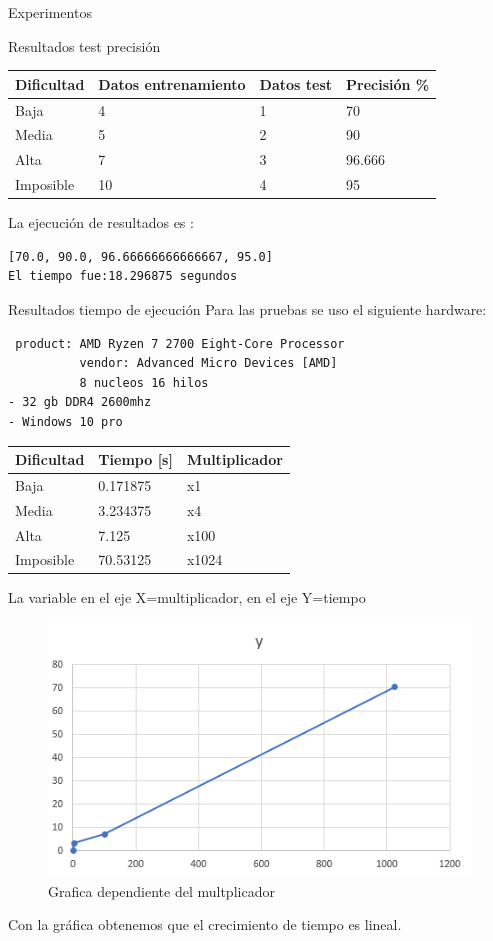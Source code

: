 \documentclass[
  spanish,
  ignorenonframetext,
]{beamer}
\begin{document}
\begin{frame}[fragile]{Experimentos}
\begin{block}{Resultados test precisión}
\begin{longtable}[]{@{}llll@{}}
\toprule
Dificultad & Datos entrenamiento & Datos test & Precisión
\%\tabularnewline
\midrule
\endhead
Baja & 4 & 1 & 70\tabularnewline
Media & 5 & 2 & 90\tabularnewline
Alta & 7 & 3 & 96.666\tabularnewline
Imposible & 10 & 4 & 95\tabularnewline
\bottomrule
\end{longtable}

La ejecución de resultados es :

\begin{verbatim}
[70.0, 90.0, 96.66666666666667, 95.0]
El tiempo fue:18.296875 segundos
\end{verbatim}
\end{block}

\begin{block}{Resultados tiempo de ejecución}
\protect\hypertarget{resultados-tiempo-de-ejecuciuxf3n}{}
Para las pruebas se uso el siguiente hardware:

\begin{verbatim}
 product: AMD Ryzen 7 2700 Eight-Core Processor
          vendor: Advanced Micro Devices [AMD]
          8 nucleos 16 hilos
- 32 gb DDR4 2600mhz
- Windows 10 pro
\end{verbatim}

\begin{longtable}[]{@{}lll@{}}
\toprule
Dificultad & Tiempo {[}s{]} & Multiplicador\tabularnewline
\midrule
\endhead
Baja & 0.171875 & x1\tabularnewline
Media & 3.234375 & x4\tabularnewline
Alta & 7.125 & x100\tabularnewline
Imposible & 70.53125 & x1024\tabularnewline
\bottomrule
\end{longtable}

La variable en el eje X=multiplicador, en el eje Y=tiempo

\begin{figure}
\centering
\includegraphics{img/README/image-20220516004324192.png}
\caption{Grafica dependiente del multplicador}
\end{figure}

Con la gráfica obtenemos que el crecimiento de tiempo es lineal.
\end{block}
\end{frame}
\end{document}
